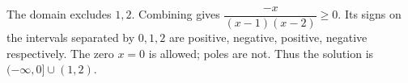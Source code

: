 The domain excludes $1,2$. Combining gives $\dfrac{-x}{(x-1)(x-2)}\ge0$. Its signs on the intervals separated by $0,1,2$ are positive, negative, positive, negative respectively. The zero $x=0$ is allowed; poles are not. Thus the solution is $\boxed{(-\infty,0]\cup(1,2)}$.
